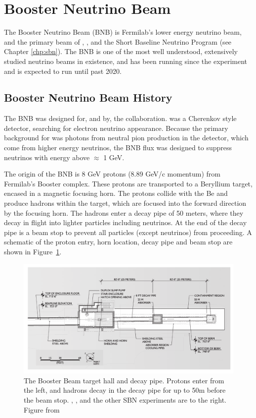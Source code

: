 \section{Booster Neutrino Beam}
\label{sec:bnb}

The Booster Neutrino Beam (BNB) is Fermilab's lower energy neutrino beam, and the primary beam of \MB, \uboone, and the Short Baseline Neutrino Program (see Chapter \ref{chp:sbn}).  The BNB is one of the most well understood, extensively studied neutrino beams in existence, and has been running since the \MB experiment and is expected to run until past 2020.

\subsection{Booster Neutrino Beam History}
The BNB was designed for, and by, the \MB collaboration.  \MB was a Cherenkov style detector, searching for electron neutrino appearance.  Because the primary background for \MB was photons from neutral pion production in the detector, which come from higher energy neutrinos, the BNB flux was designed to suppress neutrinos with energy above $\approx$ 1 GeV.

The origin of the BNB is 8 GeV protons (8.89 GeV/c momentum) from Fermilab's Booster complex.  These protons are transported to a Beryllium target, encased in a magnetic focusing horn.  The protons collide with the Be and produce hadrons within the target, which are focused into the forward direction by the focusing horn.  The hadrons enter a decay pipe of 50 meters, where they decay in flight into lighter particles including neutrinos.  At the end of the decay pipe is a beam stop to prevent all particles (except neutrinos) from proceeding.  A schematic of the proton entry, horn location, decay pipe and beam stop are shown in Figure~\ref{fig:mb_target_schematic}.

\begin{figure}[tb]
  \centering
  \includegraphics[width=\textwidth]{beams_figures/mb_target_schematic}
  \caption[BNB Target Schematic]{The Booster Beam target hall and decay pipe.  Protons enter from the left, and hadrons decay in the decay pipe for up to 50m before the beam stop.  \MB, \uboone, and the other SBN experiments are to the right. Figure from \cite{AguilarArevalo:2008yp}}
  \label{fig:mb_target_schematic}
\end{figure}

